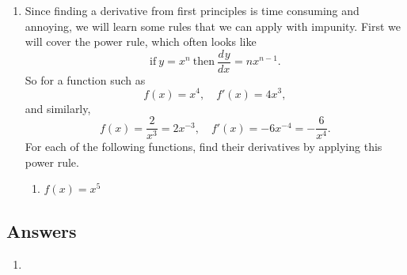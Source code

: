 \documentclass[a4paper,12pt]{article}
\newcommand{\deriv}[3][]{\frac{d^{#1}#2}{d#3^{#1}}}
\begin{document}
\begin{enumerate}
\item Since finding a derivative from first principles is time consuming and 
annoying, we will learn some rules that we can apply with impunity. First 
we will cover the power rule, which often looks like
$$\mathrm{if~} y = x^n \mathrm{~then~} \deriv{y}{x} = nx^{n - 1}.$$
So for a function such as 
$$f(x) = x^4,\quad f'(x) = 4x^3,$$
and similarly,
$$f(x) = \frac{2}{x^3} = 2x^{-3}, \quad f'(x) = -6x^{-4} = -\frac{6}{x^4}.$$
For each of the following functions, find their derivatives by applying 
this power rule.
    \begin{multicols}{2}
    \begin{enumerate}
    \item $f(x) = x^5$
    \end{enumerate}
    \end{multicols}

\end{enumerate}
\newpage
\subsection*{Answers}

\begin{enumerate}
\item 
\end{enumerate}
\end{document}

